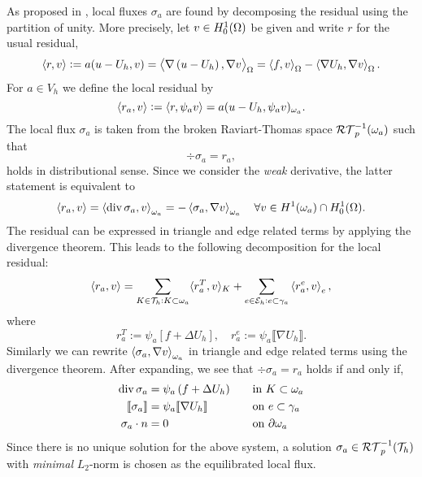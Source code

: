 \documentclass[thesis.tex]{subfiles}
\begin{document}
As proposed  in \cite{braessequilrobust}, local fluxes $\sigma_a$ are found by decomposing the residual using the partition of unity. 
More precisely, let $v \in H_0^1(\Omega)$ be given and write $r$ for the usual residual, 
\[
  \left \langle r,v \right \rangle := a(u - U_h, v) = \left \langle \nabla \left(u - U_h\right), \nabla v \right \rangle_\Omega = \left \langle f,v \right \rangle_\Omega - \left \langle \nabla U_h,\nabla v \right \rangle_\Omega.
\]
For $a \in V_h$ we define the local residual by
\[
  \left \langle r_a,v \right \rangle := \left \langle r,\psi_a v \right \rangle = a(u - U_h, \psi_a v)_{\omega_a}.
\]
The local flux $\sigma_a$ is taken from the broken Raviart-Thomas space $\mathcal{RT}_{p}^{-1}(\omega_a)$ such that
\[
\div \sigma_a = r_a,
\]
holds in distributional sense. Since we consider the \emph{weak} derivative, the latter
statement is equivalent to
\[
  \left \langle r_a, v \right \rangle = \left \langle \operatorname{div} \sigma_a, v \right \rangle_{\omega_a} = - \left \langle \sigma_a, \nabla v \right \rangle_{\omega_a} \quad \forall v \in H^1(\omega_a) \cap H_0^1(\Omega).
\]
The residual can be expressed in triangle and edge related terms by applying the divergence theorem.
This leads to the following decomposition for the local residual:
\begin{equation}
  \label{eq:locdecomp}
  \left \langle r_a,v \right \rangle = \sum_{K \in \mathcal{T}_h : K\subset \omega_a} \langle{r^T_a, v}\rangle_K + \sum_{e \in \mathcal{E}_h: e \subset \gamma_a} \left \langle r^e_a, v \right \rangle_e,
\end{equation}
where 
\[
  r^T_a := \psi_a \left[ f + \Delta U_h \right], \quad r^e_a := \psi_a \llbracket \nabla U_h \rrbracket.
\]
Similarly we can rewrite $\left \langle \sigma_a, \nabla v \right \rangle_{\omega_a}$ in triangle and edge related terms using the divergence theorem.
After expanding, we see that $\div \sigma_a = r_a$ holds if and only if,
\begin{alignat}{3}
  \operatorname{div} \sigma_a &= \psi_a \left (f + \Delta U_h\right) && \quad\text{in }  K\subset \omega_a \label{eq:sigmacons}\\
  \llbracket \sigma_a \rrbracket &= \psi_a \llbracket \nabla U_h \rrbracket && \quad \text{on } e \subset \gamma_a\nonumber\\
  \sigma_a \cdot n &= 0 &&\quad \text{on } \partial \omega_a\nonumber
\end{alignat}
Since there is no unique solution for the above system, a solution $\sigma_a \in \mathcal{RT}_p^{-1}(\mathcal{T}_h)$
with \emph{minimal} $L_2$-norm is chosen as the equilibrated local flux.
\end{document}
